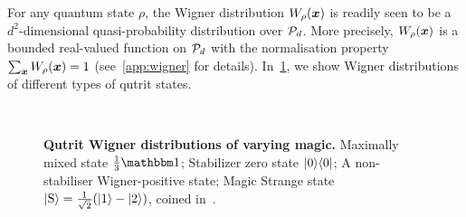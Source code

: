 \documentclass[pra,
aps,
twocolumn,
superscriptaddress,
groupedaddress,
nofootinbib,
reprint
]{revtex4-1}
\begin{document}
For any quantum state $\rho$, the Wigner distribution $W_\rho(\bmx)$ is readily seen to be a $d^2$-dimensional quasi-probability distribution over $\cal{P}_d$. More precisely, $W_\rho(\x)$ is a bounded real-valued function on $\P_d$ with the normalisation property $\sum_{\x} W_\rho(\bmx) = 1$ (see~\cref{app:wigner} for details).  In~\cref{fig:wstate_examples}, we show Wigner distributions of different types of qutrit states.

\begin{figure}[t]
    \centering
    \hspace{8pt}%
    \\
    \hspace{8pt}%
    \caption{\textbf{Qutrit Wigner distributions of varying magic.} 
     Maximally mixed state $\frac{1}{3}\id$;  Stabilizer zero state $|0\>\<0|$;  A non-stabiliser Wigner-positive state;  Magic Strange state $\ket{{\rm{S}}} = \frac{1}{\sqrt{2}}(\ket{1} - \ket{2})$, coined in~\cite{cit:veitch2}.
    }%
    \label{fig:wstate_examples}
\end{figure}
\end{document}
